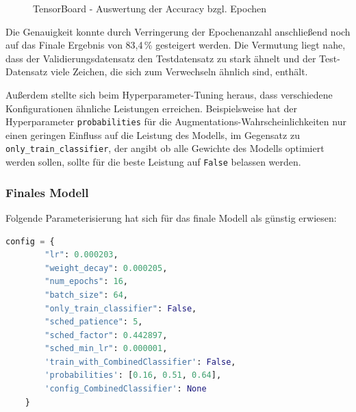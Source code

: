 \documentclass[12pt,oneside]{article}
\begin{document}
	\begin{figure}[h]
		\centering
		\hspace{0.5cm}
		\caption{TensorBoard - Auswertung der Accuracy bzgl. Epochen}
		\label{fig:TensorBoardAccuracy}
	\end{figure}
	
	Die Genauigkeit konnte durch Verringerung der Epochenanzahl anschließend noch auf das Finale Ergebnis von 83,4\,\% gesteigert werden. Die Vermutung liegt nahe, dass der Validierungsdatensatz den Testdatensatz zu stark ähnelt und der Test-Datensatz viele Zeichen, die sich zum Verwechseln ähnlich sind, enthält. 
	
	Außerdem stellte sich beim Hyperparameter-Tuning heraus, dass verschiedene Konfigurationen ähnliche Leistungen erreichen. Beispielsweise hat der Hyperparameter \texttt{probabilities} für die Augmentations-Wahrscheinlichkeiten nur einen geringen Einfluss auf die Leistung des Modells, im Gegensatz zu \texttt{only\_train\_classifier}, der angibt ob alle Gewichte des Modells optimiert werden sollen, sollte für die beste Leistung auf \texttt{False} belassen werden.
	
  
  \subsubsection{Finales Modell}
  Folgende Parameterisierung hat sich für das finale Modell als günstig erwiesen:
  \begin{lstlisting}[language=Python, basicstyle=\small\ttfamily]
	config = {
		"lr": 0.000203,
		"weight_decay": 0.000205,
		"num_epochs": 16,
		"batch_size": 64,
		"only_train_classifier": False,
		"sched_patience": 5,
		"sched_factor": 0.442897,
		"sched_min_lr": 0.000001,
		'train_with_CombinedClassifier': False,
		'probabilities': [0.16, 0.51, 0.64],
		'config_CombinedClassifier': None
	}
  \end{lstlisting}
  
\end{document}
